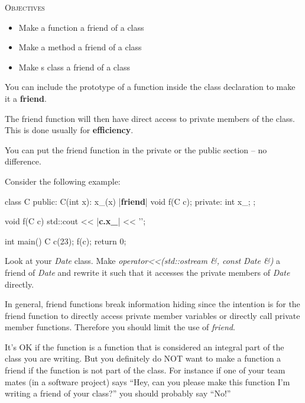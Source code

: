 \newpage{}

\textsc{Objectives}
\begin{itemize}
\item Make a function a friend of a class
\item Make a method a friend of a class
\item Make s class a friend of a class
\end{itemize}


\newpage{}

You can include the prototype of a function inside the class declaration
to make it a \textbf{friend}.

The friend function will then have direct access to private members of
the class. This is done usually for \textbf{efficiency}.

You can put the friend function in the private or the public section --
no difference.

Consider the following example:

\begin{consolethree}[escapeinside=||]
class C
{
public:
    C(int x):
        x_(x)
    {}
    |{\bf friend}| void f(C c);
private:
    int x_;
};

void f(C c)
{
    std::cout << |{\bf c.x\_}| << '\n';
}

int main()
{
    C c(23);
    f(c);
    return 0;
}
\end{consolethree}

\begin{ex}
Look at your \textit{Date} class. Make
\textit{operator<<(std::ostream \&, const Date \&)} a
friend of \textit{Date} and rewrite it such that it accesses the private
members of \textit{Date} directly.
\end{ex}

In general, friend functions break information hiding since the
intention is for the friend function to directly access private member
variables or directly call private member functions. Therefore you
should limit the use of \textit{friend}.

It's OK if the function is a function that is considered an integral
part of the class you are writing. But you definitely do NOT want to
make a function a friend if the function is not part of the class. For
instance if one of your team mates (in a software project) says ``Hey,
can you please make this function I'm writing a friend of your class?''
you should probably say ``No!''



